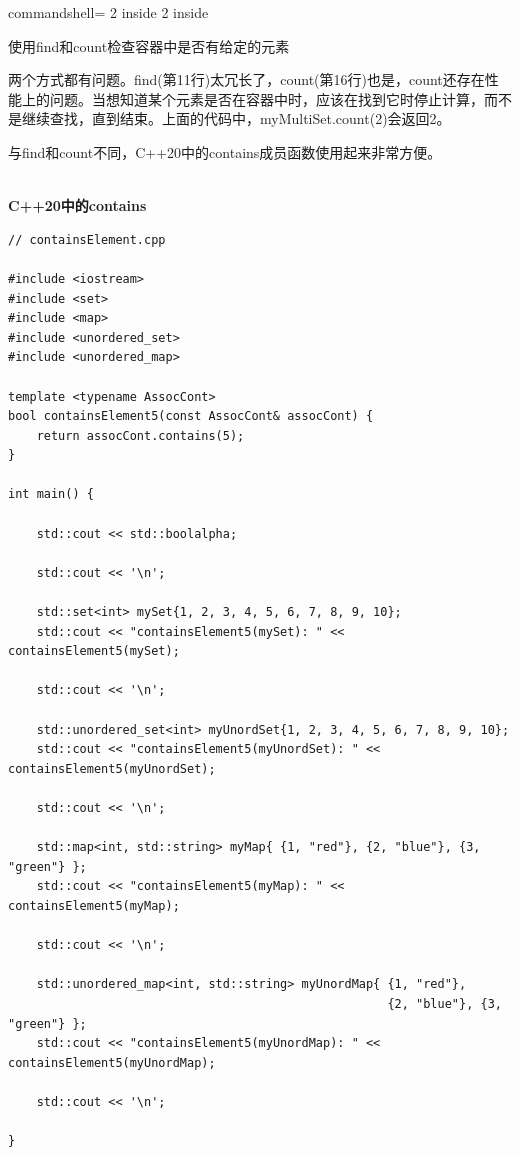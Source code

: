 \begin{tcblisting}{commandshell={}}
2 inside
2 inside
\end{tcblisting}

\begin{center}
使用find和count检查容器中是否有给定的元素
\end{center}

两个方式都有问题。find(第11行)太冗长了，count(第16行)也是，count还存在性能上的问题。当想知道某个元素是否在容器中时，应该在找到它时停止计算，而不是继续查找，直到结束。上面的代码中，myMultiSet.count(2)会返回2。

与find和count不同，C++20中的contains成员函数使用起来非常方便。

\hspace*{\fill} \\ %
\noindent
\textbf{C++20中的contains}
\begin{lstlisting}[style=styleCXX]
// containsElement.cpp

#include <iostream>
#include <set>
#include <map>
#include <unordered_set>
#include <unordered_map>

template <typename AssocCont>
bool containsElement5(const AssocCont& assocCont) {
	return assocCont.contains(5);
}

int main() {

	std::cout << std::boolalpha;
	
	std::cout << '\n';
	
	std::set<int> mySet{1, 2, 3, 4, 5, 6, 7, 8, 9, 10};
	std::cout << "containsElement5(mySet): " << containsElement5(mySet);
	
	std::cout << '\n';
	
	std::unordered_set<int> myUnordSet{1, 2, 3, 4, 5, 6, 7, 8, 9, 10};
	std::cout << "containsElement5(myUnordSet): " << containsElement5(myUnordSet);
	
	std::cout << '\n';
	
	std::map<int, std::string> myMap{ {1, "red"}, {2, "blue"}, {3, "green"} };
	std::cout << "containsElement5(myMap): " << containsElement5(myMap);
	
	std::cout << '\n';
	
	std::unordered_map<int, std::string> myUnordMap{ {1, "red"},
	                                                 {2, "blue"}, {3, "green"} };
	std::cout << "containsElement5(myUnordMap): " << containsElement5(myUnordMap);
	
	std::cout << '\n';

}
\end{lstlisting}

